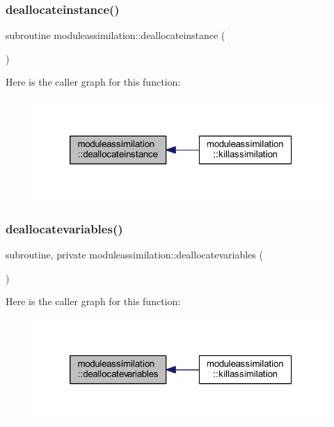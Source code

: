 \subsubsection{\texorpdfstring{deallocateinstance()}{deallocateinstance()}}
{\footnotesize\ttfamily subroutine moduleassimilation\+::deallocateinstance (\begin{DoxyParamCaption}{ }\end{DoxyParamCaption})\hspace{0.3cm}{\ttfamily [private]}}

Here is the caller graph for this function\+:\nopagebreak
\begin{figure}[H]
\begin{center}
\leavevmode
\includegraphics[width=320pt]{namespacemoduleassimilation_a90d72337a9f9a14b03745d53d1bb201f_icgraph}
\end{center}
\end{figure}
\mbox{\label{namespacemoduleassimilation_a92631d1b5885e157d6d4ef36379213e9}} 
\subsubsection{\texorpdfstring{deallocatevariables()}{deallocatevariables()}}
{\footnotesize\ttfamily subroutine, private moduleassimilation\+::deallocatevariables (\begin{DoxyParamCaption}{ }\end{DoxyParamCaption})\hspace{0.3cm}{\ttfamily [private]}}

Here is the caller graph for this function\+:\nopagebreak
\begin{figure}[H]
\begin{center}
\leavevmode
\includegraphics[width=320pt]{namespacemoduleassimilation_a92631d1b5885e157d6d4ef36379213e9_icgraph}
\end{center}
\end{figure}
\mbox{\label{namespacemoduleassimilation_a9edf40407a0e79e84d746e6bf866bf17}} 
